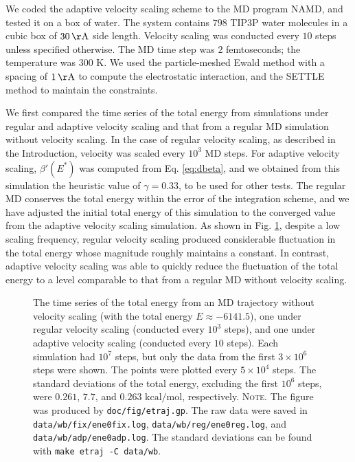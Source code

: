 \documentclass[reprint]{revtex4-1}
\newcommand{\red}[1]{{\color{red} #1}}
\newcommand{\note}[1]{{\color{DarkGreen}\footnotesize \textsc{Note.} #1}}
\begin{document}
We coded the adaptive velocity scaling scheme to
the MD program NAMD\cite{NAMD},
and tested it on a box of water.
%
The system contains
$798$ TIP3P water molecules\cite{jorgensen1983}
in a cubic box of $30 \, \mathrm{\AA}$ side length.
%
Velocity scaling was conducted every $10$ steps
unless specified otherwise.
%
The MD time step was $2$ femtoseconds;
the temperature was $300$ K.
%
We used the particle-meshed Ewald method\cite{essmann1995}
with a spacing of $1 \, \mathrm{\AA}$
to compute the electrostatic interaction,
and the SETTLE method\cite{miyamoto1992}
to maintain the constraints.


We first compared the time series of the total energy
from simulations
under regular and adaptive velocity scaling
and that from a regular MD simulation without velocity scaling.
%
In the case of regular velocity scaling,
as described in the Introduction,
velocity was scaled every $10^3$ MD steps.
%
For adaptive velocity scaling,
$\beta'(E^*)$ was computed from Eq. \eqref{eq:dbeta},
and we obtained from this simulation
the heuristic value of $\gamma = 0.33$,
to be used for other tests.
%
The regular MD conserves the total energy
within the error of the integration scheme,
and we have adjusted the initial total energy of this simulation
to the converged value from the adaptive velocity scaling simulation.
%
As shown in Fig. \ref{fig:etraj},
despite a low scaling frequency,
regular velocity scaling
produced considerable fluctuation in the total energy
whose magnitude roughly maintains a constant.
%
In contrast, adaptive velocity scaling
was able to quickly reduce the fluctuation of the total energy
to a level comparable to that
from a regular MD without velocity scaling.

\begin{figure}[h]
\begin{center}
  \caption{
    \label{fig:etraj}
    The time series of the total energy
    from an MD trajectory
    without velocity scaling (with the total energy $E \approx -6141.5$),
    one under regular velocity scaling
    (conducted every $10^3$ steps),
    and
    one under adaptive velocity scaling (conducted every $10$ steps).
    Each simulation had $10^7$ steps,
    but only the data from the first $3\times 10^6$ steps were shown.
    The points were plotted every $5 \times 10^4$ steps.
    The standard deviations of the total energy,
    excluding the first $10^6$ steps,
    were \red{$0.261$, $7.7$, and $0.263$} $\mathrm{kcal/mol}$,
    respectively.
    \note{The figure was produced by \texttt{doc/fig/etraj.gp}.
      The raw data were saved in
      \texttt{data/wb/fix/ene0fix.log},
      \texttt{data/wb/reg/ene0reg.log},
      and
      \texttt{data/wb/adp/ene0adp.log}.
      The standard deviations can be found with
      \texttt{make etraj -C data/wb}.
    }%
  }
\end{center}
\end{figure}
\end{document}

